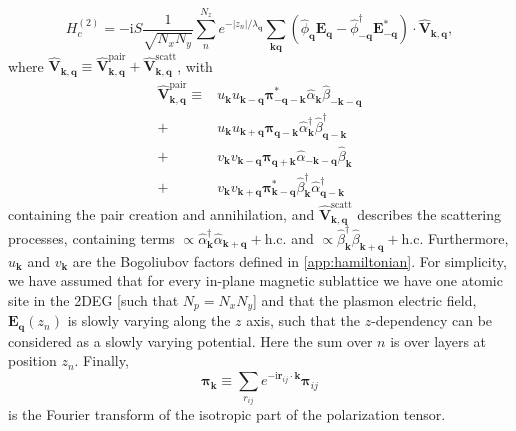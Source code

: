 \documentclass[aps,prb,reprint,twocolumns,superscriptaddress,nofootinbib]{revtex4-2}
\newcommand{\hc}{\text{h.c.}}
\newcommand{\ii}{\mathrm{i}}
\begin{document}
	\begin{equation}
		H_c^{(2)}=-\ii S {\frac{1}{\sqrt{N_x N_y}}}\sum_n^{N_z}e^{- |z_n|/\lambda_{\bm q}} \sum_{\bm k\bm q}(\hat\phi_{\bm q}\bm E_{\bm q} - \hat\phi^\dagger_{-\bm q}\bm E_{-\bm q}^*)\cdot \hat{ \bm V}_{\bm k,\bm q}, \label{eq:Hc-AFM-final}
	\end{equation}
	where $\hat{\bm V}_{\bm k,\bm q}\equiv \hat{\bm V}_{\bm k,\bm q}^{\mathrm{pair}}+\hat{\bm V}_{\bm k,\bm q}^{\mathrm{scatt}}$, with
	\begin{align}
		\hat{\bm V}_{\bm k,\bm q}^{\mathrm{pair}} \equiv &u_{\bm k}u_{\bm k-\bm q} \bm\pi_{-\bm q-\bm k}^*\hat\alpha_{\bm k}\hat\beta_{-\bm k - \bm q}  \nonumber\\
		+ &u_{\bm k}u_{\bm k+\bm q} \bm\pi_{\bm q- \bm k} \hat\alpha_{\bm k}^\dagger \hat\beta_{\bm q-\bm k}^\dagger \nonumber\\ 
		+  
		&v_{\bm k}v_{\bm k-\bm q}\bm\pi_{\bm q+\bm k} \hat\alpha_{-\bm k-\bm q}\hat\beta_{\bm k} \nonumber\\
		+&v_{\bm k}v_{\bm k+\bm q}\bm\pi_{\bm k-\bm q}^* \hat\beta_{\bm k}^\dagger \hat\alpha_{\bm q-\bm k}^\dagger 
	\end{align}
	containing the pair creation and annihilation, and $\hat{\bm V}_{\bm k,\bm q}^{\mathrm{scatt}}$ describes the scattering processes, containing terms $\propto \hat\alpha_{\bm k}^\dagger\hat\alpha_{\bm k + \bm q}+\hc$ and $\propto \hat\beta_{\bm k}^\dagger\hat\beta_{\bm k + \bm q}+\hc$ Furthermore, $u_{\bm k}$ and $v_{\bm k}$ are the Bogoliubov factors defined in \cref{app:hamiltonian}.
	For simplicity, we have assumed that for every in-plane magnetic sublattice we have one atomic site in the 2DEG [such that $N_p=N_xN_y$]
	and that the plasmon electric field, $\bm E_{\bm q}(z_n)$ is slowly varying along the $z$ axis, such that the $z$-dependency can be considered as a slowly varying potential. Here the sum over $n$ is over layers at position $z_n$.
	Finally,
	\begin{equation}
		\bm \pi_{\bm k} \equiv \sum_{r_{ij}} e^{-\ii\bm r_{ij} \cdot \bm k} \bm \pi_{ij}
	\end{equation}
	is the Fourier transform of the isotropic part of the polarization tensor. 
\end{document}
